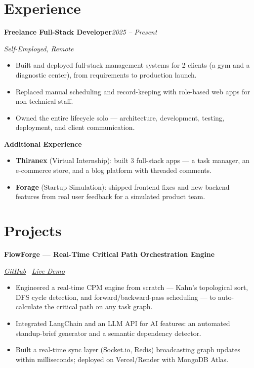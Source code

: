 \documentclass[10pt,a4paper]{article}
\newcommand{\heading}[2]{\noindent\textbf{#1}\hfill\textit{\small #2}\par}
\newcommand{\subheading}[1]{\noindent\textit{\small #1}\par\vspace{2pt}}
\begin{document}
\section*{Experience}

\heading{Freelance Full-Stack Developer}{2025 -- Present}
\subheading{Self-Employed, Remote}
\begin{itemize}
    \item Built and deployed full-stack management systems for 2 clients (a gym and a diagnostic center), from requirements to production launch.
    \item Replaced manual scheduling and record-keeping with role-based web apps for non-technical staff.
    \item Owned the entire lifecycle solo --- architecture, development, testing, deployment, and client communication.
\end{itemize}

\heading{Additional Experience}{}
\begin{itemize}
    \item \textbf{Thiranex} (Virtual Internship): built 3 full-stack apps --- a task manager, an e-commerce store, and a blog platform with threaded comments.
    \item \textbf{Forage} (Startup Simulation): shipped frontend fixes and new backend features from real user feedback for a simulated product team.
\end{itemize}

\section*{Projects}

\heading{FlowForge --- Real-Time Critical Path Orchestration Engine}{}
\subheading{\href{https://github.com/GwSaikat/FlowForge}{GitHub} \textbar\ \href{https://client-one-bay-37.vercel.app/}{Live Demo}}
\begin{itemize}
    \item Engineered a real-time CPM engine from scratch --- Kahn's topological sort, DFS cycle detection, and forward/backward-pass scheduling --- to auto-calculate the critical path on any task graph.
    \item Integrated LangChain and an LLM API for AI features: an automated standup-brief generator and a semantic dependency detector.
    \item Built a real-time sync layer (Socket.io, Redis) broadcasting graph updates within milliseconds; deployed on Vercel/Render with MongoDB Atlas.
\end{itemize}
\end{document}
